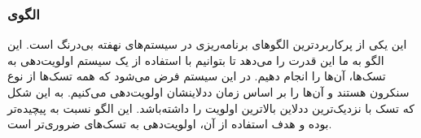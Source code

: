 \subsubsection{الگوی }
\label{scheduleStaticPriSec}
\begin{RTL}
این یکی از پرکاربردترین الگوهای برنامه‌ریزی در سیستم‌های نهفته بی‌درنگ
است. این الگو به ما این قدرت را می‌دهد تا بتوانیم با استفاده از
یک سیستم اولویت‌دهی به تسک‌ها، آن‌ها را انجام دهیم. در این
سیستم فرض می‌شود که همه تسک‌ها از نوع سنکرون هستند و
آن‌ها را بر اساس زمان ددلاینشان اولویت‌دهی می‌کنیم. به این شکل که
تسک با نزدیک‌ترین ددلاین بالاترین اولویت را داشته‌باشد. این الگو نسبت
به  پیچیده‌تر بوده
و هدف استفاده از آن، اولویت‌دهی به تسک‌های ضروری‌تر است.
\end{RTL}
